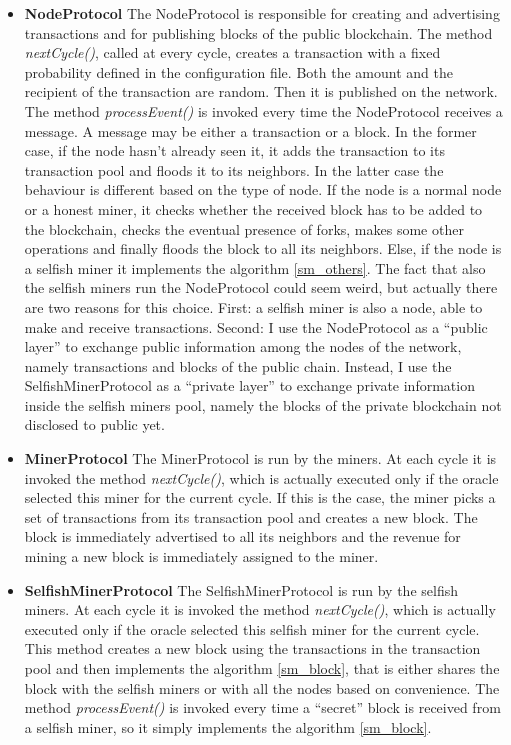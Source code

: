 \documentclass{article}
\begin{document}
\begin{itemize}
\item \textbf{NodeProtocol} The NodeProtocol is responsible for creating and advertising transactions and for publishing blocks of the public blockchain. The method \textit{nextCycle()}, called at every cycle, creates a transaction with a fixed probability defined in the configuration file. Both the amount and the recipient of the transaction are random. Then it is published on the network. The method \textit{processEvent()} is invoked every time the NodeProtocol receives a message. A message may be either a transaction or a block. In the former case, if the node hasn't already seen it, it adds the transaction to its transaction pool and floods it to its neighbors. In the latter case the behaviour is different based on the type of node. If the node is a normal node or a honest miner, it checks whether the received block has to be added to the blockchain, checks the eventual presence of forks, makes some other operations and finally floods the block to all its neighbors. Else, if the node is a selfish miner it implements the algorithm \ref{sm_others}. The fact that also the selfish miners run the NodeProtocol could seem weird, but actually there are two reasons for this choice. First: a selfish miner is also a node, able to make and receive transactions. Second: I use the NodeProtocol as a ``public layer'' to exchange public information among the nodes of the network, namely transactions and blocks of the public chain. Instead, I use the SelfishMinerProtocol as a ``private layer'' to exchange private information inside the selfish miners pool, namely the blocks of the private blockchain not disclosed to public yet. 
\item \textbf{MinerProtocol} The MinerProtocol is run by the miners. At each cycle it is invoked the method \textit{nextCycle()}, which is actually executed only if the oracle selected this miner for the current cycle. If this is the case, the miner picks a set of transactions from its transaction pool and creates a new block. The block is immediately advertised to all its neighbors and the revenue for mining a new block is immediately assigned to the miner.  
\item \textbf{SelfishMinerProtocol} The SelfishMinerProtocol is run by the selfish miners. At each cycle it is invoked the method \textit{nextCycle()}, which is actually executed only if the oracle selected this selfish miner for the current cycle. This method creates a new block using the transactions in the transaction pool and then implements the algorithm \ref{sm_block}, that is either shares the block with the selfish miners or with all the nodes based on convenience. The method \textit{processEvent()} is invoked every time a ``secret'' block is received from a selfish miner, so it simply implements the algorithm \ref{sm_block}.
\end{itemize}
\end{document}
